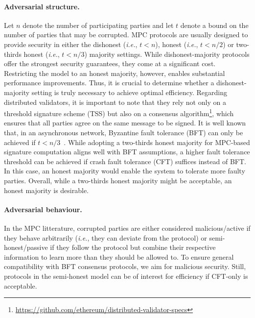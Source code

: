 \paragraph{Adversarial structure.}
Let $n$ denote the number of participating parties and let $t$ denote a bound on the number of parties that may be corrupted.
MPC protocols are usually designed to provide security in either the dishonest (\textit{i.e.}, $t < n$), honest (\textit{i.e.}, $t < n/2$) or two-thirds honest (\textit{i.e.}, $t < n/3$) majority settings.
While dishonest-majority protocols offer the strongest security guarantees, they come at a significant cost.
Restricting the model to an honest majority, however, enables substantial performance improvements.
Thus, it is crucial to determine whether a dishonest-majority setting is truly necessary to achieve optimal efficiency.
Regarding distributed validators, it is important to note that they rely not only on a threshold signature scheme (TSS) but also on a consensus algorithm\footnote{\url{https://github.com/ethereum/distributed-validator-specs}}, which ensures that all parties agree on the same message to be  signed.
It is well known that, in an asynchronous network, Byzantine fault tolerance (BFT) can only be achieved if $t < n/3$~\cite{10.1145/322186.322188}.
While adopting a two-thirds honest majority for MPC-based signature computation aligns well with BFT assumptions, a higher fault tolerance threshold can be achieved if crash fault tolerance (CFT) suffices instead of BFT.
In this case, an honest majority would enable the system to tolerate more faulty parties.
Overall, while a two-thirds honest majority might be acceptable, an honest majority is desirable.
 
\paragraph{Adversarial behaviour.}
In the MPC litterature, corrupted parties are either considered malicious/active if they behave arbitrarily (\textit{i.e.}, they can deviate from the protocol) or semi-honest/passive if they follow the protocol but combine their respective information to learn more than they should be allowed to.
To ensure general compatibility with BFT consensus protocols, we aim for malicious security.
Still, protocols in the semi-honest model can be of interest for efficiency if CFT-only is acceptable.


